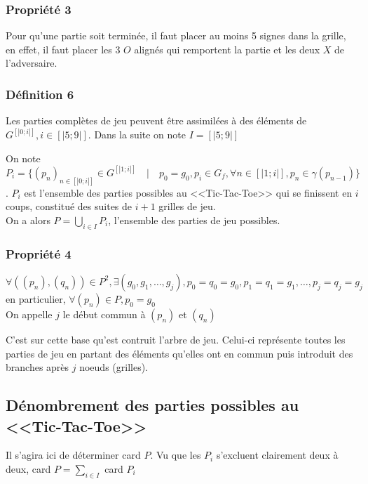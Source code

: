 \documentclass{article}
\begin{document}
\subsubsection{Propriété 3}

Pour qu'une partie soit terminée, il faut placer au moins 5 signes dans la grille, en effet, il faut placer les 3 $O$ alignés qui remportent la partie et les deux $X$ de l'adversaire.

\subsubsection{Définition 6}
Les parties complètes de jeu peuvent être assimilées à des éléments de $G^{[|0;i|]}, i \in [|5;9|]$. Dans la suite on note $I = [|5;9|]$

On note $P_{i} = \{ (p_{n})_{n \in [|0;i|]} \in G^{[|1;i|]} \quad | \quad p_{0} = g_{0} , p_{i} \in G_{f} , \forall n \in [|1;i|], p_{n} \in \gamma(p_{n-1}) \}$. $P_{i}$ est l'ensemble des parties possibles au <<Tic-Tac-Toe>> qui se finissent en $i$ coups, constitué des suites de $i+1$ grilles de jeu. \\ 


On a alors $P = \displaystyle \bigcup_{i \in I} P_{i}$, l'ensemble des parties de jeu possibles.

\subsubsection{Propriété 4}

$\forall ((p_{n}),(q_{n})) \in P^{2}, \exists (g_{0},g_{1},\dots,g_{j}), p_{0}=q_{0}=g_{0}, p_{1}=q_{1}=g_{1}, \dots, p_{j}=q_{j}=g_{j}$ en particulier, $ \forall (p_{n}) \in P, p_{0}= g_{0}$ \\

On appelle $j$ le début commun à $(p_{n})$ et $(q_{n})$

C'est sur cette base qu'est contruit l'arbre de jeu. Celui-ci représente toutes les parties de jeu en partant des éléments qu'elles ont en commun puis introduit des branches après $j$ noeuds (grilles).

\subsection{Dénombrement des parties possibles au <<Tic-Tac-Toe>>}

Il s'agira ici de déterminer card $P$. Vu que les $P_{i}$ s'excluent clairement deux à deux, card $P = \displaystyle \sum_{i \in I} $ card $P_{i}$
\end{document}
